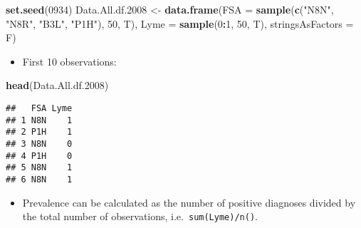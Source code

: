 \documentclass[
]{article}
\newenvironment{Shaded}{\begin{snugshade}}{\end{snugshade}}
\newcommand{\DataTypeTok}[1]{\textcolor[rgb]{0.13,0.29,0.53}{#1}}
\newcommand{\DecValTok}[1]{\textcolor[rgb]{0.00,0.00,0.81}{#1}}
\newcommand{\FloatTok}[1]{\textcolor[rgb]{0.00,0.00,0.81}{#1}}
\newcommand{\KeywordTok}[1]{\textcolor[rgb]{0.13,0.29,0.53}{\textbf{#1}}}
\newcommand{\NormalTok}[1]{#1}
\newcommand{\OperatorTok}[1]{\textcolor[rgb]{0.81,0.36,0.00}{\textbf{#1}}}
\newcommand{\StringTok}[1]{\textcolor[rgb]{0.31,0.60,0.02}{#1}}
\providecommand{\tightlist}{%
  \setlength{\itemsep}{0pt}\setlength{\parskip}{0pt}}
\begin{document}
\begin{Shaded}
\begin{Highlighting}[]
\KeywordTok{set.seed}\NormalTok{(}\DecValTok{0934}\NormalTok{)}
\NormalTok{Data.All.df}\FloatTok{.2008}\NormalTok{ <-}\StringTok{ }\KeywordTok{data.frame}\NormalTok{(}\DataTypeTok{FSA =} \KeywordTok{sample}\NormalTok{(}\KeywordTok{c}\NormalTok{(}\StringTok{"N8N"}\NormalTok{, }\StringTok{"N8R"}\NormalTok{, }\StringTok{"B3L"}\NormalTok{, }\StringTok{"P1H"}\NormalTok{), }\DecValTok{50}\NormalTok{, T),}
                               \DataTypeTok{Lyme =} \KeywordTok{sample}\NormalTok{(}\DecValTok{0}\OperatorTok{:}\DecValTok{1}\NormalTok{, }\DecValTok{50}\NormalTok{, T),}
                               \DataTypeTok{stringsAsFactors =}\NormalTok{ F)}
\end{Highlighting}
\end{Shaded}

\begin{itemize}
\tightlist
\item
  First 10 observations:
\end{itemize}

\begin{Shaded}
\begin{Highlighting}[]
\KeywordTok{head}\NormalTok{(Data.All.df}\FloatTok{.2008}\NormalTok{)}
\end{Highlighting}
\end{Shaded}

\begin{verbatim}
##   FSA Lyme
## 1 N8N    1
## 2 P1H    1
## 3 N8N    0
## 4 P1H    0
## 5 N8N    1
## 6 N8N    1
\end{verbatim}

\begin{itemize}
\tightlist
\item
  Prevalence can be calculated as the number of positive diagnoses
  divided by the total number of observations,
  i.e.~\texttt{sum(Lyme)/n()}.
\end{itemize}

\begin{Shaded}
\end{Shaded}
\end{document}

